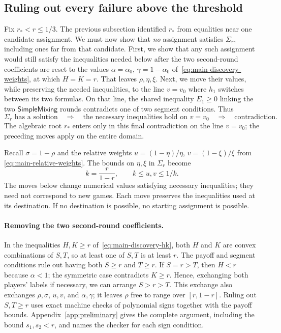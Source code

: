 \documentclass[11pt]{article}
\theoremstyle{remark}
\theoremstyle{plain}
\newcommand{\sm}{\mathsf{SimpleMixing}}
\begin{document}
\subsection{Ruling out every failure above the threshold}
\label{sec:guarantee}

Fix $r_*<r\le1/3$. The previous subsection identified $r_*$ from
equalities near one candidate assignment. We must now show that
\emph{no} assignment satisfies $\Sigma_r$, including ones far
from that candidate. First, we show that any such assignment would
still satisfy the inequalities needed below after the two
second-round coefficients are reset to the values
$\alpha=\alpha_0$, $\gamma=1-\alpha_0$ of~\eqref{eq:main-discovery-weights},
at which $H=K=r$.
That leaves $\rho,\eta,\xi$. Next, we move their values, while
preserving the needed inequalities, to the line $v=v_0$ where
$h_1$ switches between its two formulas. On that line, the shared
inequality $E_1\ge0$ linking the two $\sm$ rounds contradicts one of
two segment conditions. Thus
\[
 \Sigma_r\text{ has a solution}
 \quad\Longrightarrow\quad
 \text{the necessary inequalities hold on }v=v_0
 \quad\Longrightarrow\quad
 \text{contradiction}.
\]
The algebraic root $r_*$ enters only in this final contradiction on
the line $v=v_0$; the preceding moves apply on the entire domain.

Recall $\sigma=1-\rho$ and the relative weights
$u=(1-\eta)/\eta$, $v=(1-\xi)/\xi$ from
\eqref{eq:main-relative-weights}. The bounds on $\eta,\xi$ in
$\Sigma_r$ become
\begin{equation}
 k=\frac r{1-r},\qquad k\le u,v\le1/k.
 \label{eq:main-global-weight-domain}
\end{equation}
The moves below change numerical values satisfying necessary
inequalities; they need not correspond to new games. Each move
preserves the inequalities used at its destination. If no
destination is possible, no starting assignment is possible.

\paragraph{Removing the two second-round coefficients.}
In the inequalities $H,K\ge r$ of~\eqref{eq:main-discovery-hk}, both
$H$ and $K$ are
convex combinations of $S,T$, so at least one of $S,T$ is at least
$r$. The payoff and segment conditions rule out having both
$S\ge r$ and $T\ge r$. If $S=r>T$, then $H<r$ because $\alpha<1$;
the symmetric case contradicts $K\ge r$. Hence, exchanging both
players' labels if necessary, we can arrange $S>r>T$.
This exchange also exchanges $\rho,\sigma$, $u,v$, and $\alpha,\gamma$;
it leaves $\rho$ free to range over $[r,1-r]$.
Ruling out $S,T\ge r$ uses exact machine checks of polynomial
signs together with the payoff bounds. Appendix~\ref{app:preliminary}
gives the complete argument, including the bound $s_1,s_2<r$,
and names the checker for each sign condition.
\end{document}

